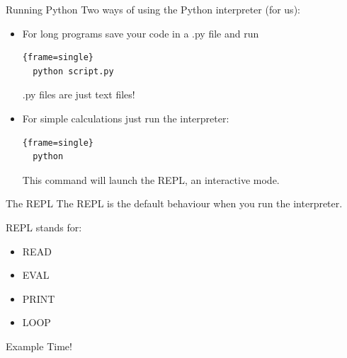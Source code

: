 \documentclass{beamer}
\begin{document}
\begin{frame}[fragile]{Running Python}
 Two ways of using the Python interpreter (for us):
\begin{itemize}
\item For long programs save your code in a .py file and run
  \begin{block}{}
  \begin{lstlisting}{frame=single}
  python script.py 
  \end{lstlisting}
\end{block}
  .py files are just text files!
  \item For simple calculations just run the interpreter:
  \begin{block}{}
  \begin{lstlisting}{frame=single}
  python 
  \end{lstlisting}
\end{block}
This command will launch the REPL, an interactive mode.
\end{itemize}
\end{frame}

\begin{frame}[fragile]{The REPL}
  The REPL is the default behaviour when you run the interpreter.
  \begin{block}{REPL stands for:}
  	\begin{itemize}
  		\item READ
  		\item EVAL
  		\item PRINT
  		\item LOOP
  	\end{itemize}
  \end{block}
\end{frame}
\begin{frame}
	Example Time!
\end{frame}
\end{document}
